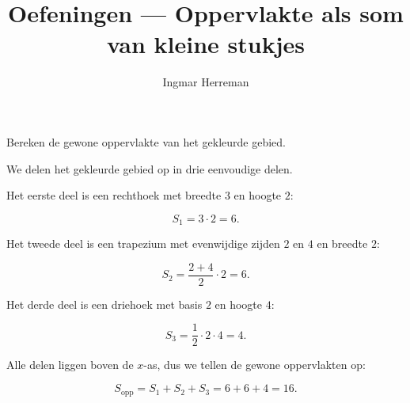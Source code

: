 \documentclass{ximera}
\title{Oefeningen --- Oppervlakte als som van kleine stukjes}
\author{Ingmar Herreman}
\begin{document}











\maketitle

\FVDbeginExercises







\begin{oefening}{\oefB\ESS}

Bereken de gewone oppervlakte van het gekleurde gebied.

\begin{center}
\end{center}

\begin{oplossing}

We delen het gekleurde gebied op in drie eenvoudige delen.

Het eerste deel is een rechthoek met breedte \(3\) en hoogte \(2\):

\[
S_1=3\cdot2=6.
\]

Het tweede deel is een trapezium met evenwijdige zijden \(2\) en \(4\)
en breedte \(2\):

\[
S_2=\frac{2+4}{2}\cdot2=6.
\]

Het derde deel is een driehoek met basis \(2\) en hoogte \(4\):

\[
S_3=\frac12\cdot2\cdot4=4.
\]

Alle delen liggen boven de \(x\)-as, dus we tellen de gewone
oppervlakten op:

\[
S_{\mathrm{opp}}
=
S_1+S_2+S_3
=
6+6+4
=
\boxed{16}.
\]

\end{oplossing}

\end{oefening}
\end{document}
